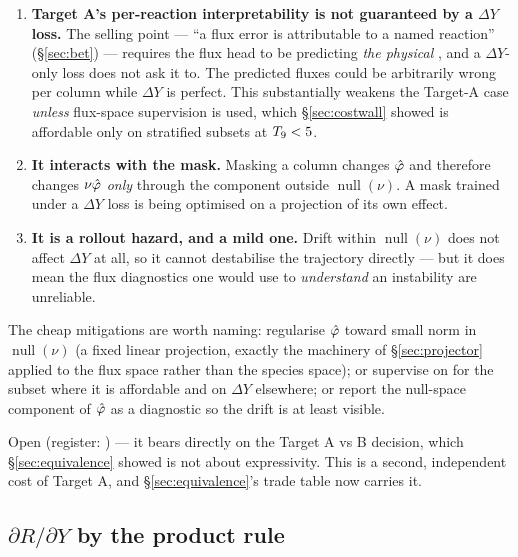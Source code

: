\begin{enumerate}
\item \textbf{Target A's per-reaction interpretability is not guaranteed by a
  $\Delta Y$ loss.} The selling point --- ``a flux error is attributable to a
  named reaction'' (\S\ref{sec:bet}) --- requires the flux head to be predicting
  \emph{the physical} \Phifl, and a $\Delta Y$-only loss does not ask it to. The
  predicted fluxes could be arbitrarily wrong per column while $\Delta Y$ is
  perfect. This substantially weakens the Target-A case \emph{unless} flux-space
  supervision is used, which \S\ref{sec:costwall} showed is affordable only on
  stratified subsets at $T_{9} < 5$.
\item \textbf{It interacts with the mask.} Masking a column changes
  $\hat{\varphi}$ and therefore changes $\nu\hat{\varphi}$ \emph{only} through the
  component outside $\operatorname{null}(\nu)$. A mask trained under a $\Delta Y$
  loss is being optimised on a projection of its own effect.
\item \textbf{It is a rollout hazard, and a mild one.} Drift within
  $\operatorname{null}(\nu)$ does not affect $\Delta Y$ at all, so it cannot
  destabilise the trajectory directly --- but it does mean the flux diagnostics
  one would use to \emph{understand} an instability are unreliable.
\end{enumerate}

The cheap mitigations are worth naming: regularise $\hat{\varphi}$ toward small
norm in $\operatorname{null}(\nu)$ (a fixed linear projection, exactly the
machinery of \S\ref{sec:projector} applied to the flux space rather than the
species space); or supervise on \Phifl{} for the subset where it is affordable
and on $\Delta Y$ elsewhere; or report the null-space component of
$\hat{\varphi}$ as a diagnostic so the drift is at least visible.

Open (register: ) --- it bears directly on the Target A vs B decision,
which \S\ref{sec:equivalence} showed is not about expressivity. This is a
second, independent cost of Target A, and \S\ref{sec:equivalence}'s trade table
now carries it.

\subsection{\texorpdfstring{$\partial R/\partial Y$}{dR/dY} by the product rule}
\label{sec:productrule}

